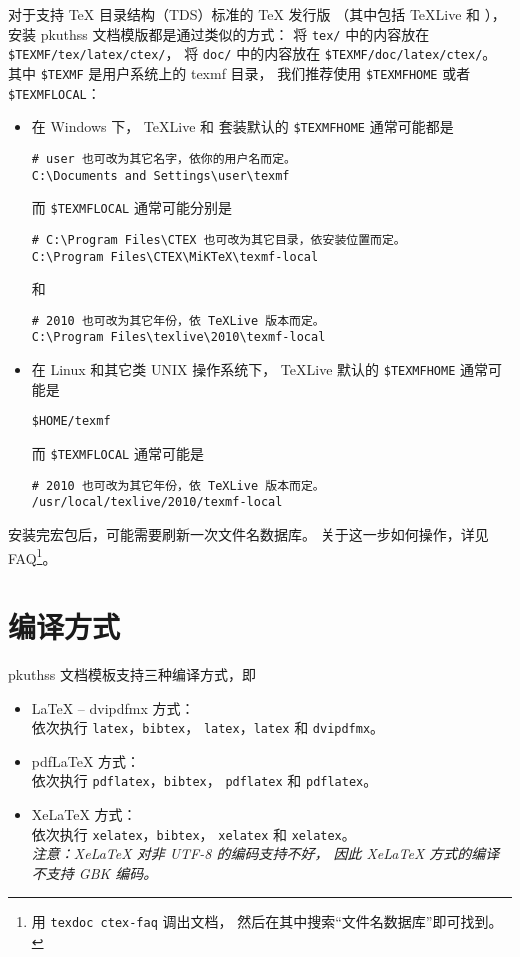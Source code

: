 	对于支持 \TeX{} 目录结构（TDS）标准的 \TeX{} 发行版%
	（其中包括 \TeX{}Live 和 \CTeX{}），
	安装 pkuthss 文档模版都是通过类似的方式：
	将 \verb|tex/| 中的内容放在 \verb|$TEXMF/tex/latex/ctex/|，
	将 \verb|doc/| 中的内容放在 \verb|$TEXMF/doc/latex/ctex/|。
	其中 \verb|$TEXMF| 是用户系统上的 texmf 目录，
	我们推荐使用 \verb|$TEXMFHOME| 或者 \verb|$TEXMFLOCAL|：
	\begin{itemize}
		\item 在 Windows 下，
			\TeX{}Live 和 \CTeX{} 套装默认的 \verb|$TEXMFHOME| %
			通常可能都是
\begin{Verbatim}[frame=single]
# user 也可改为其它名字，依你的用户名而定。
C:\Documents and Settings\user\texmf
\end{Verbatim}
			而 \verb|$TEXMFLOCAL| 通常可能分别是
\begin{Verbatim}[frame=single]
# C:\Program Files\CTEX 也可改为其它目录，依安装位置而定。
C:\Program Files\CTEX\MiKTeX\texmf-local
\end{Verbatim}
			和
\begin{Verbatim}[frame=single]
# 2010 也可改为其它年份，依 TeXLive 版本而定。
C:\Program Files\texlive\2010\texmf-local
\end{Verbatim}
		\item 在 Linux 和其它类 UNIX 操作系统下，
			\TeX{}Live 默认的 \verb|$TEXMFHOME| 通常可能是
\begin{Verbatim}[frame=single]
$HOME/texmf
\end{Verbatim}
			而 \verb|$TEXMFLOCAL| 通常可能是
\begin{Verbatim}[frame=single]
# 2010 也可改为其它年份，依 TeXLive 版本而定。
/usr/local/texlive/2010/texmf-local
\end{Verbatim}
	\end{itemize}

	安装完宏包后，可能需要刷新一次文件名数据库。
	关于这一步如何操作，详见 \CTeX{} FAQ\cite{ctex-faq}\footnote{%
		用 \texttt{texdoc ctex-faq} 调出文档，
		然后在其中搜索“文件名数据库”即可找到。%
	}。

	\section{编译方式}

	pkuthss 文档模板支持三种编译方式，即
	\begin{itemize}
		\item \LaTeX{} -- dvipdfmx 方式：\\
			依次执行 \verb|latex|，\verb|bibtex|，%
			\verb|latex|，\verb|latex| 和 \verb|dvipdfmx|。
		\item pdf\LaTeX{} 方式：\\
			依次执行 \verb|pdflatex|，\verb|bibtex|，%
			\verb|pdflatex| 和 \verb|pdflatex|。
		\item Xe\LaTeX{} 方式：\\
			依次执行 \verb|xelatex|，\verb|bibtex|，%
			\verb|xelatex| 和 \verb|xelatex|。\\
			\emph{%
				注意：Xe\LaTeX{} 对非 UTF-8 的编码支持不好，
				因此 Xe\LaTeX{} 方式的编译不支持 GBK 编码。
			}
	\end{itemize}

